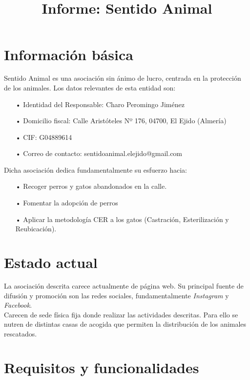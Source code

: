 \documentclass[12pt]{article}
\author{}
\title{Informe: Sentido Animal}
\date{}
\theoremstyle{definition}
\begin{document}
\maketitle

\section*{Información básica}

Sentido Animal es una asociación sin ánimo de lucro, centrada en la protección de los animales. Los datos relevantes de esta entidad son:

\begin{itemize}
\item[•] Identidad del Responsable: Charo Peromingo Jiménez
\item[•] Domicilio fiscal: Calle Aristóteles Nº 176, 04700, El Ejido (Almería)
\item[•] CIF: G04889614
\item[•] Correo de contacto: sentidoanimal.elejido@gmail.com
\end{itemize}

Dicha asociación dedica fundamentalmente su esfuerzo hacia:

\begin{itemize}
\item[•] Recoger perros y gatos abandonados en la calle.
\item[•] Fomentar la adopción de perros 
\item[•] Aplicar la metodología CER a los gatos (Castración, Esterilización y Reubicación).
\end{itemize}

\section*{Estado actual}

La asociación descrita carece actualmente de página web. Su principal fuente de difusión y promoción son las redes sociales, fundamentalmente \textit{Instagram} y \textit{Facebook}.\\

Carecen de sede física fija donde realizar las actividades descritas. Para ello se nutren de distintas casas de acogida que permiten la distribución de los animales rescatados.

\section*{Requisitos y funcionalidades}
\end{document}
